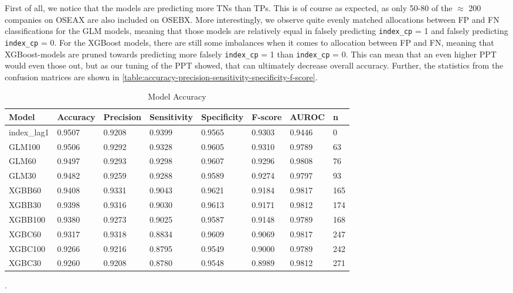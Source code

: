 First of all, we notice that the models are predicting more TNs than TPs. This is of course as expected, as only 50-80 of the $\approx$ 200 companies on OSEAX are also included on OSEBX. More interestingly, we observe quite evenly matched allocations between FP and FN classifications for the GLM models, meaning that those models are relatively equal in falsely predicting \texttt{index\_cp} = 1 and falsely predicting \texttt{index\_cp} = 0. For the XGBoost models, there are still some imbalances when it comes to allocation between FP and FN, meaning that XGBoost-models are pruned towards predicting more falsely \texttt{index\_cp} = 1 than \texttt{index\_cp} = 0. This can mean that an even higher PPT would even those out, but as our tuning of the PPT showed, that can ultimately decrease overall accuracy. Further, the statistics from the confusion matrices are shown in \autoref{table:accuracy-precision-sensitivity-specificity-f-score}.

\begin{table}[ht]
\centering
\begin{tabular}{llllllll}
  \toprule
Model & Accuracy & Precision & Sensitivity & Specificity & F-score & AUROC & n \\ 
  \midrule
index\_lag1 & 0.9507 & 0.9208 & 0.9399 & 0.9565 & 0.9303  & 0.9446 & 0 \\
  \midrule
GLM100 & 0.9506 & 0.9292 & 0.9328 & 0.9605 & 0.9310 & 0.9789 &    63 \\ 
GLM60 & 0.9497 & 0.9293 & 0.9298 & 0.9607 & 0.9296 & 0.9808 &    76 \\ 
GLM30 & 0.9482 & 0.9259 & 0.9288 & 0.9589 & 0.9274 & 0.9797 &    93 \\ 
XGBB60 & 0.9408 & 0.9331 & 0.9043 & 0.9621 & 0.9184 & 0.9817 &   165 \\ 
XGBB30 & 0.9398 & 0.9316 & 0.9030 & 0.9613 & 0.9171 & 0.9812 &   174 \\ 
XGBB100 & 0.9380 & 0.9273 & 0.9025 & 0.9587 & 0.9148 & 0.9789 &   168 \\ 
XGBC60 & 0.9317 & 0.9318 & 0.8834 & 0.9609 & 0.9069 & 0.9817 &   247 \\ 
XGBC100 & 0.9266 & 0.9216 & 0.8795 & 0.9549 & 0.9000 & 0.9789 &   242 \\ 
 XGBC30 & 0.9260 & 0.9208 & 0.8780 & 0.9548 & 0.8989 & 0.9812 &   271 \\ 
   \bottomrule
\end{tabular}
\vspace{1em}
\caption{{Model Accuracy}}
. 
\label{table:accuracy-precision-sensitivity-specificity-f-score}
\end{table}


